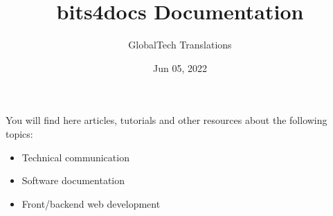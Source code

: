 \documentclass[a4paper,10pt,english,openany,oneside]{sphinxmanual}
\title{bits4docs Documentation}
\date{Jun 05, 2022}
\author{GlobalTech Translations}
\begin{document}
\pagestyle{empty}
\sphinxmaketitle
\pagestyle{plain}
\sphinxtableofcontents
\pagestyle{normal}
\label{\detokenize{index::doc}}


\sphinxAtStartPar
You will find here articles, tutorials and other resources about the following topics:
\begin{itemize}
\item {} 
\sphinxAtStartPar
Technical communication

\item {} 
\sphinxAtStartPar
Software documentation

\item {} 
\sphinxAtStartPar
Front/backend web development

\end{itemize}

\sphinxAtStartPar
{}
\end{document}

